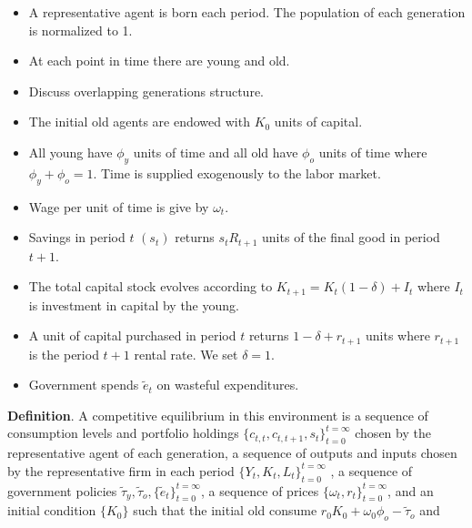 \documentclass{sebase}
\begin{document}
\begin{itemize}
\item A representative agent is born each period. The population of each
generation is normalized to 1.

\item At each point in time there are young and old.

\item Discuss overlapping generations structure.

\item The initial old agents are endowed with $K_{0}$ units of capital$.$

\item All young have $\phi _{y}$ units of time and all old have $\phi _{o}$
units of time where $\phi _{y}+\phi _{o}=1.$ Time is supplied exogenously to
the labor market.\pagebreak

\item Wage per unit of time is give by $\omega _{t}$.

\item Savings in period $t$ $(s_{t})$ returns $s_{t}R_{t+1}$ units of the
final good in period $t+1.$

\item The total capital stock evolves according to $K_{t+1}=K_{t}\left(
1-\delta \right) +I_{t}$ where $I_{t}$ is investment in capital by the young.

\item A unit of capital purchased in period $t$ returns $1-\delta +r_{t+1}$
units where $r_{t+1}$ is the period $t+1$ rental rate. We set $\delta =1.$

\item Government spends $\tilde{e}_{t}$ on wasteful expenditures.
\end{itemize}

\pagebreak

\textbf{Definition}. A competitive equilibrium in this environment is a
sequence of consumption levels and portfolio holdings $%
\{c_{t,t},c_{t,t+1},s_{t}\}_{t=0}^{t=\infty }$ chosen by the representative
agent of each generation, a sequence of outputs and inputs chosen by the
representative firm in each period $\{Y_{t},K_{t},L_{t}\}_{t=0}^{t=\infty }$%
, a sequence of government policies $\tilde{\tau}_{y},\tilde{\tau}_{o},\{%
\tilde{e}_{t}\}_{t=0}^{t=\infty }$, a sequence of prices $\{\omega
_{t},r_{t}\}_{t=0}^{t=\infty }$, and an initial condition $\{K_{0}\}$ such
that the initial old consume $r_{0}K_{0}+\omega _{0}\phi _{o}-\tilde{\tau}%
_{o}$ and
\end{document}
